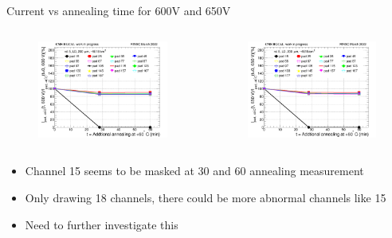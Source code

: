 \documentclass{beamer}
\begin{document}
\begin{frame}{Current vs annealing time for 600V and 650V}
  \begin{columns}
       \begin{figure}
           \includegraphics[width=1.0\textwidth]{plots/8in_198ch_2019_N4790_09_4E15_neg40degC_annealing_current_600.png}
       \end{figure}
       \begin{figure}
           \includegraphics[width=1.0\textwidth]{plots/8in_198ch_2019_N4790_09_4E15_neg40degC_annealing_current_650.png}
       \end{figure}
   \end{columns}
   \begin{itemize}
      \item Channel 15 seems to be masked at 30 and 60 annealing measurement
     \item Only drawing 18 channels, there could be more abnormal channels like 15
     \item Need to further investigate this
   \end{itemize}
\end{frame}
\end{document}

